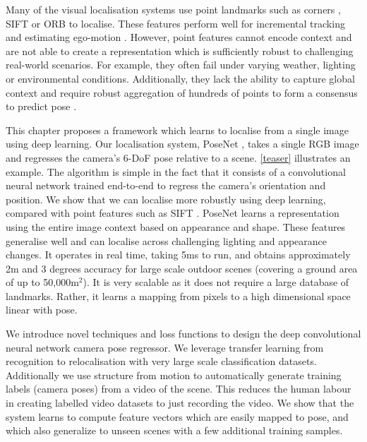 Many of the visual localisation systems use point landmarks such as corners \citep{robertson2004image}, SIFT \citep{lowe2004distinctive} or ORB \citep{rublee2011orb} to localise. These features perform well for incremental tracking and estimating ego-motion \citep{mur2015orb}. However, point features cannot encode context and are not able to create a representation which is sufficiently robust to challenging real-world scenarios. For example, they often fail under varying weather, lighting or environmental conditions. Additionally, they lack the ability to capture global context and require robust aggregation of hundreds of points to form a consensus to predict pose \citep{zeisl2015camera}.





This chapter proposes a framework which learns to localise from a single image using deep learning. Our localisation system, PoseNet \citep{kendall2015posenet,kendall2015modelling,kendall2017posenet}, takes a single RGB image and regresses the camera's 6-DoF pose relative to a scene. \cref{teaser} illustrates an example. The algorithm is simple in the fact that it consists of a convolutional neural network trained end-to-end to regress the camera's orientation and position. We show that we can localise more robustly using deep learning, compared with point features such as SIFT \citep{lowe2004distinctive}. PoseNet learns a representation using the entire image context based on appearance and shape. These features generalise well and can localise across challenging lighting and appearance changes. It operates in real time, taking 5ms to run, and obtains approximately 2m and 3 degrees accuracy for large scale outdoor scenes (covering a ground area of up to 50,000m$^2$). It is very scalable as it does not require a large database of landmarks. Rather, it learns a mapping from pixels to a high dimensional space linear with pose.

We introduce novel techniques and loss functions to design the deep convolutional neural network camera pose regressor. We leverage transfer learning from recognition to relocalisation with very large scale classification datasets. Additionally we use structure from motion to automatically generate training labels (camera poses) from a video of the scene. This reduces the human labour in creating labelled video datasets to just recording the video. We show that the system learns to compute feature vectors which are easily mapped to pose, and which also generalize to unseen scenes with a few additional training samples.

